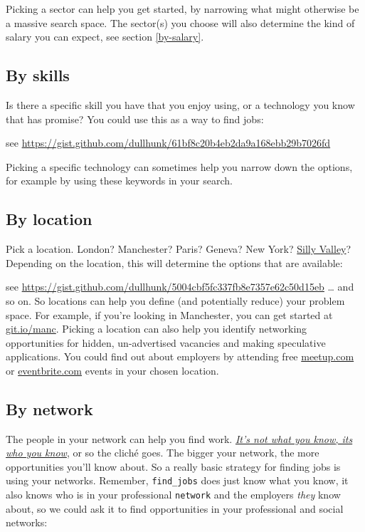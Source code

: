 \documentclass[
]{book}
\begin{document}
Picking a sector can help you get started, by narrowing what might otherwise be a massive search space. The sector(s) you choose will also determine the kind of salary you can expect, see section \ref{by-salary}. \citep{letsmakelotsofmoney}

\hypertarget{by-skills}{%
\subsection{By skills}\label{by-skills}}

Is there a specific skill you have that you enjoy using, or a technology you know that has promise? You could use this as a way to find jobs:

see \url{https://gist.github.com/dullhunk/61bf8c20b4eb2da9a168ebb29b7026fd}

Picking a specific technology can sometimes help you narrow down the options, for example by using these keywords in your search.

\hypertarget{by-location}{%
\subsection{By location}\label{by-location}}

Pick a location. London? Manchester? Paris? Geneva? New York? \href{https://en.wikipedia.org/wiki/Silicon_Valley}{Silly Valley}? Depending on the location, this will determine the options that are available:

see \url{https://gist.github.com/dullhunk/5004cbf5fc337fb8e7357e62c50d15eb}
\ldots{} and so on. So locations can help you define (and potentially reduce) your problem space. For example, if you're looking in Manchester, you can get started at \href{https://git.io/manc}{git.io/manc}. Picking a location can also help you identify networking opportunities for hidden, un-advertised vacancies and making speculative applications. You could find out about employers by attending free \href{https://www.meetup.com/}{meetup.com} or \href{https://www.eventbrite.com/}{eventbrite.com} events in your chosen location.

\hypertarget{weakties}{%
\subsection{By network}\label{weakties}}

The people in your network can help you find work. \emph{\href{https://en.wiktionary.org/wiki/it\%27s_not_what_you_know_but_who_you_know}{It's not what you know, its who you know}}, or so the cliché goes. \citep{newfads} The bigger your network, the more opportunities you'll know about. So a really basic strategy for finding jobs is using your networks. Remember, \texttt{find\_jobs} does just know what you know, it also knows who is in your professional \texttt{network} and the employers \emph{they} know about, so we could ask it to find opportunities in your professional and social networks:
\end{document}
